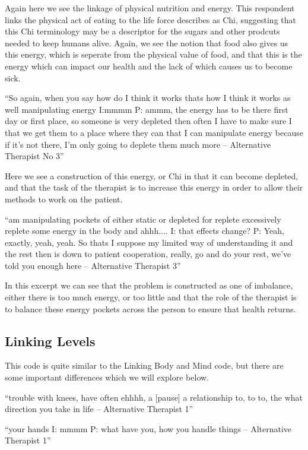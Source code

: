 Again here we see the linkage of physical nutrition and energy. This respondent links the physical act of eating to the life force describes as Chi, suggesting that this Chi terminology may be a descriptor for the sugars and other prodcuts needed to keep humans alive. Again, we see the notion that food also gives us this energy, which is seperate from the physical value of food, and that this is the energy which can impact our health and the lack of which causes us to become sick. 



``So again, when you say how do I think it works thats how I think it works as well manipulating energy
I:mmmm
P: ammm, the energy has to be there first day or first place, so someone is very depleted then often I have to make sure I that we get them to a place where they can that I can manipulate energy because if it's not there, I'm only going to deplete them much more – Alternative Therapist No 3''

Here we see a construction of this energy, or Chi in that it can become depleted, and that the task of the therapist is to increase this energy in order to allow their methods to work on the patient. 

``am manipulating pockets of either static or depleted for replete excessively replete some energy in the body and ahhh....
I: that effects change?
P: Yeah, exactly, yeah, yeah. So thats I suppose my limited way of understanding it and the rest then is down to patient cooperation, really, go and do your rest, we've told you enough here – Alternative Therapist 3''

In this excerpt we can see that the problem is constructed as one of imbalance, either there is too much energy, or too little and that the role of the therapist is to balance these energy pockets across the person to ensure that health returns. 

\subsection{Linking Levels}

This code is quite similar to the Linking Body and Mind code, but there are some important differences which we will explore below. 

``trouble with knees, have often ehhhh, a [pause] a relationship to, to to, the what direction you take in life – Alternative Therapist 1''

``your hands 
I: mmmm
P: what have you, how you handle things – Alternative Therapist 1''

